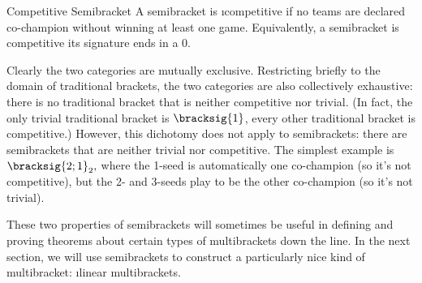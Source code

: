 {    \begin{definition}{Competitive Semibracket}{}
        A semibracket is \i{competitive} if no teams are declared co-champion without winning at least one game. Equivalently, a semibracket is competitive its signature ends in a $0.$
    \end{definition}

    Clearly the two categories are mutually exclusive. Restricting briefly to the domain of traditional brackets, the two categories are also collectively exhaustive: there is no traditional bracket that is neither competitive nor trivial. (In fact, the only trivial traditional bracket is $\bracksig{1}$, every other traditional bracket is competitive.) However, this dichotomy does not apply to semibrackets: there are semibrackets that are neither trivial nor competitive. The simplest example is $\bracksig{2;1}_2,$ where the 1-seed is automatically one co-champion (so it's not competitive), but the 2- and 3-seeds play to be the other co-champion (so it's not trivial).


    These two properties of semibrackets will sometimes be useful in defining and proving theorems about certain types of multibrackets down the line. In the next section, we will use semibrackets to construct a particularly nice kind of multibracket: \i{linear multibrackets.}


}